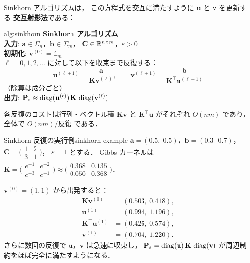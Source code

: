 Sinkhorn アルゴリズムは，
この方程式を交互に満たすように
$\mathbf{u}$ と $\mathbf{v}$ を更新する
\textbf{交互射影法}である：

\begin{algorithm}{alg:sinkhorn}
\textbf{Sinkhorn アルゴリズム} \\[4pt]
\textbf{入力}: $\mathbf{a} \in \Sigma_n$，$\mathbf{b} \in \Sigma_m$，
$\mathbf{C} \in \mathbb{R}^{n \times m}$，$\varepsilon > 0$ \\
\textbf{初期化}: $\mathbf{v}^{(0)} = \mathbb{1}_m$ \\[2pt]
$\ell = 0, 1, 2, \ldots$ に対して以下を収束まで反復する：
\[
  \mathbf{u}^{(\ell+1)} = \frac{\mathbf{a}}{\mathbf{K}\mathbf{v}^{(\ell)}},
  \qquad
  \mathbf{v}^{(\ell+1)} = \frac{\mathbf{b}}{\mathbf{K}^\top \mathbf{u}^{(\ell+1)}}
\]
（除算は成分ごと） \\[2pt]
\textbf{出力}: $\mathbf{P}_\varepsilon \approx
\operatorname{diag}(\mathbf{u}^{(\ell)})\, \mathbf{K}\, \operatorname{diag}(\mathbf{v}^{(\ell)})$
\end{algorithm}

各反復のコストは行列・ベクトル積 $\mathbf{K}\mathbf{v}$ と
$\mathbf{K}^\top \mathbf{u}$ がそれぞれ $O(nm)$ であり，
全体で $O(nm)$/反復 である．

\begin{example}{Sinkhorn 反復の実行例}{sinkhorn-example}
$\mathbf{a} = (0.5,\; 0.5)$，$\mathbf{b} = (0.3,\; 0.7)$，
$\mathbf{C} = \bigl(\begin{smallmatrix} 1 & 2 \\ 3 & 1 \end{smallmatrix}\bigr)$，
$\varepsilon = 1$ とする．
Gibbs カーネルは
$\mathbf{K} = \bigl(\begin{smallmatrix} e^{-1} & e^{-2} \\ e^{-3} & e^{-1} \end{smallmatrix}\bigr)
\approx \bigl(\begin{smallmatrix} 0.368 & 0.135 \\ 0.050 & 0.368 \end{smallmatrix}\bigr)$．

$\mathbf{v}^{(0)} = (1, 1)$ から出発すると：
\begin{align*}
  \mathbf{K}\mathbf{v}^{(0)} &= (0.503,\; 0.418), \\
  \mathbf{u}^{(1)} &= (0.994,\; 1.196), \\
  \mathbf{K}^\top \mathbf{u}^{(1)} &= (0.426,\; 0.574), \\
  \mathbf{v}^{(1)} &= (0.704,\; 1.220).
\end{align*}
さらに数回の反復で $\mathbf{u}$，$\mathbf{v}$ は急速に収束し，
$\mathbf{P}_\varepsilon = \operatorname{diag}(\mathbf{u})\, \mathbf{K}\, \operatorname{diag}(\mathbf{v})$
が周辺制約をほぼ完全に満たすようになる．
\end{example}

